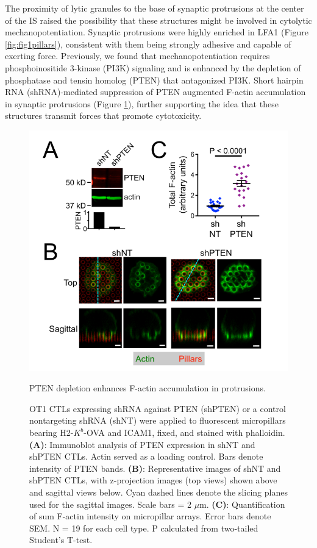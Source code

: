 The proximity of lytic granules to the base of synaptic protrusions at the center of the IS raised the possibility that these structures might be involved in cytolytic mechanopotentiation. Synaptic protrusions were highly enriched in LFA1 (Figure \ref{fig:fig1pillars}), consistent with them being strongly adhesive and capable of exerting force. Previously, we found that mechanopotentiation requires phosphoinositide 3-kinase (PI3K) signaling and is enhanced by the depletion of phosphatase and tensin homolog (PTEN) that antagonized PI3K. Short hairpin RNA (shRNA)-mediated suppression of PTEN augmented F-actin accumulation in synaptic protrusions (Figure \ref{fig:fig1ptenprotrusions}), further supporting the idea that these structures transmit forces that promote cytotoxicity.

\begin{figure}[htbp]
	\centering
	\includegraphics[width=\textwidth]{../figures/chapter2/fig1ptenprotrusions.png}
	\caption{PTEN depletion enhances F-actin accumulation in protrusions.}
	\caption*{OT1 CTLs expressing shRNA against PTEN (shPTEN) or a control nontargeting shRNA (shNT) were applied to fluorescent micropillars bearing H2-$K^{b}$-OVA and ICAM1, fixed, and stained with phalloidin. \textbf{(A)}: Immunoblot analysis of PTEN expression in shNT and shPTEN CTLs. Actin served as a loading control. Bars denote intensity of PTEN bands. \textbf{(B)}: Representative images of shNT and shPTEN CTLs, with z-projection images (top views) shown above and sagittal views below. Cyan dashed lines denote the slicing planes used for the sagittal images. Scale bars = 2 $\mu$m. \textbf{(C)}: Quantification of sum F-actin intensity on micropillar arrays. Error bars denote SEM. N = 19 for each cell type. P calculated from two-tailed Student’s T-test.}
	\label{fig:fig1ptenprotrusions}
\end{figure}

